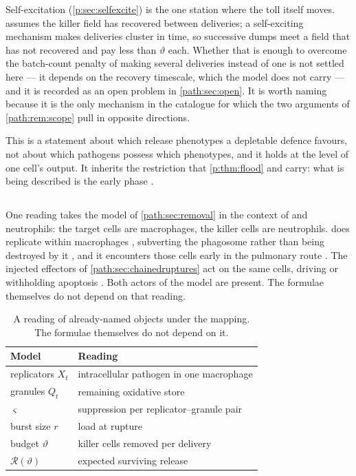 Self-excitation (\cref{p:sec:selfexcite}) is the one station where the toll
itself moves.  assumes the killer field has recovered
between deliveries; a self-exciting mechanism makes deliveries cluster in
time, so successive dumps meet a field that has not recovered and pay less
than $\vartheta$ each. Whether that is enough to overcome the batch-count
penalty of making several deliveries instead of one is not settled here ---
it depends on the recovery timescale, which the model does not carry --- and
it is recorded as an open problem in \cref{path:sec:open}. It is worth
naming because it is the only mechanism in the catalogue for which the two
arguments of \cref{path:rem:scope} pull in opposite directions.

This is a statement about which release phenotypes a depletable defence
favours, not about which pathogens possess which phenotypes, and it holds
at the level of one cell's output. It inherits the restriction that
\cref{p:thm:flood} and \cite{pearson2011stochastic} carry: what is being
described is the early phase \cite{hataye2019principles}.

\subsection{\texorpdfstring{\yp{}}{Y. pestis}}
\label{path:sec:ypestis}

One reading takes the model of \cref{path:sec:removal} in the context of
\yp{} and neutrophils: the target cells are macrophages, the killer cells
are neutrophils. \yp{} does replicate within macrophages
\cite{PujolBliska2003,KeEtAl2013}, subverting the phagosome rather than
being destroyed by it \cite{ConnorEtAl2018,PujolBliska2005}, and it
encounters those cells early in the pulmonary route
\cite{BosioEtAl2005}. The injected effectors of
\cref{path:sec:chainedruptures} act on the same cells, driving or
withholding apoptosis
\cite{MonackEtAl1997,ZaubermanEtAl2006,PetersEtAl2013}. Both actors of the
model are present. The formulae themselves do not depend on that reading.

\begin{table}[!htbp]
\centering
\small
\begin{tabular}{@{}ll@{}}
\toprule
Model & Reading \\
\midrule
replicators $X_t$ & intracellular pathogen in one macrophage \\
granules $Q_t$ & remaining oxidative store \\
$\varsigma$ & suppression per replicator--granule pair \\
burst size $r$ & load at rupture \\
budget $\vartheta$ & killer cells removed per delivery \\
$\mathcal{R}(\vartheta)$ & expected surviving release \\
\bottomrule
\end{tabular}
\caption{A reading of already-named objects under the \yp{} mapping.
The formulae themselves do not depend on it.}
\label{path:tab:ypestis}
\end{table}


